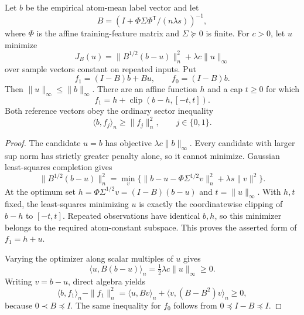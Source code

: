\begin{lemma}
\label{lem:affine-prox-geometry}
Let $b$ be the empirical atom-mean label vector and let
\[
 B=(I+\Phi\Sigma\Phi^{\mathsf T}/(n\lambda s))^{-1},
\]
where $\Phi$ is the affine training-feature matrix and $\Sigma\succeq0$ is finite. For $c>0$, let $u$ minimize
\[
 J_B(u)=\|B^{1/2}(b-u)\|_n^2+\lambda c\|u\|_\infty
\]
over sample vectors constant on repeated inputs. Put
\[
 f_1=(I-B)b+Bu,\qquad f_0=(I-B)b.
\]
Then $\|u\|_\infty\le\|b\|_\infty$. There are an affine function $h$ and a cap $t\ge0$ for which
\[
 f_1=h+\operatorname{clip}(b-h,[-t,t]).
\]
Both reference vectors obey the ordinary sector inequality
\[
 \langle b,f_j\rangle_n\ge\|f_j\|_n^2,
 \qquad j\in\{0,1\}.
\]
\end{lemma}
\begin{proof}
The candidate $u=b$ has objective $\lambda c\|b\|_\infty$. Every candidate with larger sup norm has strictly greater penalty alone, so it cannot minimize. Gaussian least-squares completion gives
\[
 \|B^{1/2}(b-u)\|_n^2
 =\min_v\{\|b-u-\Phi\Sigma^{1/2}v\|_n^2
                                      +\lambda s\|v\|^2\}.
\]
At the optimum set $h=\Phi\Sigma^{1/2}v=(I-B)(b-u)$ and $t=\|u\|_\infty$. With $h,t$ fixed, the least-squares minimizing $u$ is exactly the coordinatewise clipping of $b-h$ to $[-t,t]$. Repeated observations have identical $b,h$, so this minimizer belongs to the required atom-constant subspace. This proves the asserted form of $f_1=h+u$.

Varying the optimizer along scalar multiples of $u$ gives
\[
 \langle u,B(b-u)\rangle_n
                   =\tfrac12\lambda c\|u\|_\infty\ge0.
\]
Writing $v=b-u$, direct algebra yields
\[
 \langle b,f_1\rangle_n-\|f_1\|_n^2
 =\langle u,Bv\rangle_n+\langle v,(B-B^2)v\rangle_n\ge0,
\]
because $0\prec B\preceq I$. The same inequality for $f_0$ follows from $0\preceq I-B\preceq I$.
\end{proof}

